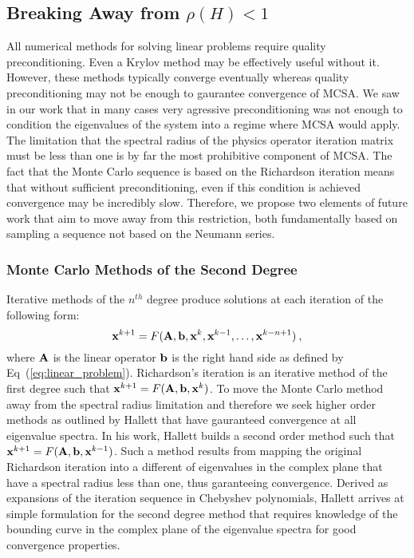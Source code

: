 \subsection{Breaking Away from $\rho(H) < 1$}
\label{subsec:future_spec_rad}

All numerical methods for solving linear problems require quality
preconditioning. Even a Krylov method may be effectively useful
without it. However, these methods typically converge eventually
whereas quality preconditioning may not be enough to gaurantee
convergence of MCSA. We saw in our work that in many cases very
agressive preconditioning was not enough to condition the eigenvalues
of the system into a regime where MCSA would apply. The limitation
that the spectral radius of the physics operator iteration matrix must
be less than one is by far the most prohibitive component of MCSA. The
fact that the Monte Carlo sequence is based on the Richardson
iteration means that without sufficient preconditioning, even if this
condition is achieved convergence may be incredibly slow. Therefore,
we propose two elements of future work that aim to move away from this
restriction, both fundamentally based on sampling a sequence not based
on the Neumann series.

\subsubsection{Monte Carlo Methods of the Second Degree}
\label{subsubsec:2_degree_mc}

Iterative methods of the $n^{th}$ degree produce solutions at each
iteration of the following form:
\begin{equation}
  \mathbf{x}^{k+1} = F(\mathbf{A},\mathbf{b},\mathbf{x}^{k},\mathbf{x}^{k-1},\dots,\mathbf{x}^{k-n+1})\:,
\label{eq:nth_degree_iter}
\end{equation}
where $\mathbf{A}$ is the linear operator $\mathbf{b}$ is the right hand side
as defined by Eq~(\ref{eq:linear_problem}). Richardson's iteration is
an iterative method of the first degree such that $\mathbf{x}^{k+1} =
F(\mathbf{A},\mathbf{b},\mathbf{x}^{k})$. To move the Monte Carlo method away from
the spectral radius limitation and therefore we seek higher order
methods as outlined by Hallett \cite{hughes_hallett_second-order_1984}
that have gauranteed convergence at all eigenvalue spectra. In his
work, Hallett builds a second order method such that $\mathbf{x}^{k+1} =
F(\mathbf{A},\mathbf{b},\mathbf{x}^{k-1})$. Such a method results from mapping the
original Richardson iteration into a different of eigenvalues in the
complex plane that have a spectral radius less than one, thus
garanteeing convergence. Derived as expansions of the iteration
sequence in Chebyshev polynomials, Hallett arrives at simple
formulation for the second degree method that requires knowledge of
the bounding curve in the complex plane of the eigenvalue spectra for
good convergence properties.

